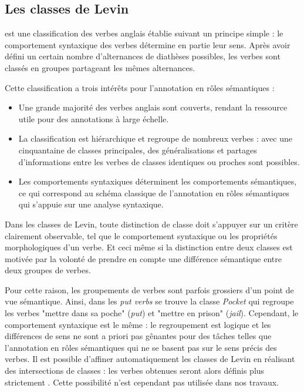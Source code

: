 \subsection{Les classes de Levin}

\cite{levin1993english} est une classification des verbes anglais établie
suivant un principe simple : le comportement syntaxique des verbes détermine en
partie leur sens. Après avoir défini un certain nombre d'alternances de
diathèses possibles, les verbes sont classés en groupes partageant les mêmes
alternances.


Cette classification a trois intérêts pour l'annotation en rôles sémantiques :

\begin{itemize}

    \item Une grande majorité des verbes anglais sont couverts, rendant la
        ressource utile pour des annotations à large échelle.

    \item La classification est hiérarchique et regroupe de nombreux verbes :
        avec une cinquantaine de classes principales, des généralisations et
        partages d'informations entre les verbes de classes identiques ou
        proches sont possibles.

    \item Les comportements syntaxiques déterminent les comportements
        sémantiques, ce qui correspond au schéma classique de l'annotation en
        rôles sémantiques qui s'appuie sur une analyse syntaxique.

\end{itemize}



Dans les classes de Levin, toute distinction de classe doit s'appuyer sur un
critère clairement observable, tel que le comportement syntaxique ou les
propriétés morphologiques d'un verbe. Et ceci même si la distinction entre deux
classes est motivée par la volonté de prendre en compte une différence
sémantique entre deux groupes de verbes.

Pour cette raison, les groupements de verbes sont parfois grossiers d'un point
de vue sémantique. Ainsi, dans les \textit{put verbs} se trouve la classe
\textit{Pocket} qui regroupe les verbes "mettre dans sa poche" (\emph{put}) et
"mettre en prison" (\emph{jail}). Cependant, le comportement syntaxique est le
même : le regroupement est logique et les différences de sens ne sont a priori
pas gênantes pour des tâches telles que l'annotation en rôles sémantiques qui
ne se basent pas sur le sens précis des verbes. Il est possible d'affiner
automatiquement les classes de Levin en réalisant des intersections de classes
: les verbes obtenues seront alors définis plus strictement
\citep{dang1998investigating}. Cette possibilité n'est cependant pas utilisée
dans nos travaux.


